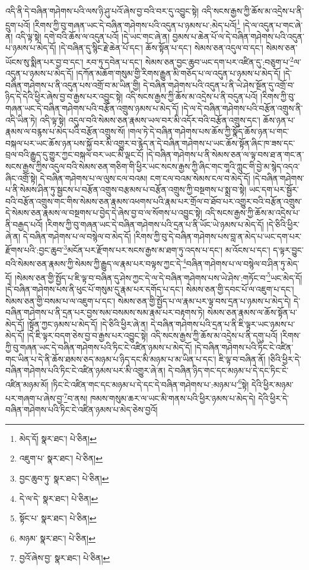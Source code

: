 འདི་ནི་དེ་བཞིན་གཤེགས་པའི་ལས་ཉི་ཤུ་པའོ་ཞེས་བྱ་བའི་བར་དུ་འབྱུང་སྟེ། འདི་སངས་རྒྱས་ཀྱི་ཆོས་མ་འདྲེས་པ་ནི་དྲུག་པའོ། །རིགས་ཀྱི་བུ་གཞན་ཡང་དེ་བཞིན་གཤེགས་པའི་འདུན་པ་ཉམས་པ་:མེད་པའོ།\footnote{མེད་དོ།  སྣར་ཐང་།  པེ་ཅིན། } །དེ་ལ་འདུན་པ་གང་ཞེ་ན། འདི་ལྟ་སྟེ། དགེ་བའི་ཆོས་ལ་འདུན་པའོ། །དེ་ཡང་གང་ཞེ་ན། བྱམས་པ་ཆེན་པོ་ལ་དེ་བཞིན་གཤེགས་པའི་འདུན་པ་ཉམས་པ་མེད་དོ། །དེ་བཞིན་དུ་སྙིང་རྗེ་ཆེན་པོ་དང་། ཆོས་སྟོན་པ་དང་། སེམས་ཅན་འདུལ་བ་དང་། སེམས་ཅན་ཡོངས་སུ་སྨིན་པར་བྱ་བ་དང་། རབ་ཏུ་དབེན་པ་དང་། སེམས་ཅན་བྱང་ཆུབ་ཡང་དག་པར་འཛིན་དུ་:བཅུག་པ་\footnote{འཇུག་པ་  སྣར་ཐང་།  པེ་ཅིན། }ལ་འདུན་པ་ཉམས་པ་མེད་དོ། །དཀོན་མཆོག་གསུམ་གྱི་རིགས་རྒྱུན་མི་གཅོད་པ་ལ་འདུན་པ་ཉམས་པ་མེད་དོ། །དེ་བཞིན་གཤེགས་པ་ནི་འདུན་པས་འགྲོ་བ་མ་ཡིན་གྱི། དེ་བཞིན་གཤེགས་པའི་འདུན་པ་ནི་ཡེ་ཤེས་སྔོན་དུ་འགྲོ་བ་ཉིད་དེ་དེའི་ཕྱིར་ཞེས་བྱ་བ་རྒྱས་པར་འབྱུང་སྟེ། འདི་སངས་རྒྱས་ཀྱི་ཆོས་མ་འདྲེས་པ་ནི་བདུན་པའོ། །རིགས་ཀྱི་བུ་གཞན་ཡང་དེ་བཞིན་གཤེགས་པའི་བརྩོན་འགྲུས་ཉམས་པ་མེད་དོ། །དེ་ལ་དེ་བཞིན་གཤེགས་པའི་བརྩོན་འགྲུས་ནི་འདི་ཡིན་ཏེ། འདི་ལྟ་སྟེ། འདུལ་བའི་སེམས་ཅན་རྣམས་ཡལ་བར་མི་འདོར་བའི་བརྩོན་འགྲུས་དང་། ཆོས་ཉན་པ་རྣམས་ལ་བརྙས་པ་མེད་པའི་བརྩོན་འགྲུས་སོ། །གལ་ཏེ་དེ་བཞིན་གཤེགས་པས་ཆོས་ཀྱི་སྣོད་ཆོས་ཉན་པ་གང་བསྐལ་པར་ཡང་ཆོས་ཉན་པས་སྐྱོ་བར་མི་འགྱུར་བ་རྙེད་ན་དེ་བཞིན་གཤེགས་པ་ཡང་ཆོས་སྟོན་ཞིང་ཁ་ཟས་དང་བྲལ་བའི་རྒྱུད་དུ་གྱུར་ཀྱང་བསྐལ་བར་ཡང་མི་ལྡང་ངོ། །དེ་བཞིན་གཤེགས་པ་ནི་སེམས་ཅན་ལ་ལྟ་བས་ཐ་ན་གང་ན་སངས་རྒྱས་ཀྱིས་འདུལ་བའི་སེམས་ཅན་གཅིག་གི་ཕྱིར་ཡང་སངས་རྒྱས་ཀྱི་ཞིང་གང་གཱའི་ཀླུང་གི་བྱེ་མ་སྙེད་འདའ་ཞིང་འགྲོ་སྟེ། དེ་བཞིན་གཤེགས་པ་ལ་ལུས་ངལ་བའམ། ངག་ངལ་བའམ་སེམས་ངལ་བ་མེད་དོ། །དེ་བཞིན་གཤེགས་པ་ནི་སེམས་ཤིན་ཏུ་སྦྱངས་པ་བརྩོན་འགྲུས་བརྩམས་པ་བརྩོན་འགྲུས་ཀྱི་བསྔགས་པ་སྨྲ་བ་སྟེ། ཡང་དག་པར་སྦྱོར་བའི་བརྩོན་འགྲུས་གང་གིས་སེམས་ཅན་རྣམས་འཕགས་པའི་རྣམ་པར་གྲོལ་བ་ཐོབ་པར་འགྱུར་བའི་བརྩོན་འགྲུས་དེ་སེམས་ཅན་རྣམས་ལ་བསྔགས་པ་བྱེད་དེ་ཞེས་བྱ་བ་ལ་སོགས་པ་འབྱུང་སྟེ། འདི་སངས་རྒྱས་ཀྱི་ཆོས་མ་འདྲེས་པ་ནི་བརྒྱད་པའོ། །རིགས་ཀྱི་བུ་གཞན་ཡང་དེ་བཞིན་གཤེགས་པའི་དྲན་པ་ནི་ཡོང་ཡེ་ཉམས་པ་མེད་དོ། །དེ་ཅིའི་ཕྱིར་ཞེ་ན། དེ་བཞིན་གཤེགས་པ་ལ་བསྙེལ་བ་མེད་དོ། །རིགས་ཀྱི་བུ་དེ་བཞིན་གཤེགས་པས་བླ་ན་མེད་པ་ཡང་དག་པར་རྫོགས་པའི་:བྱང་ཆུབ་\footnote{བྱང་ཆུབ་ཏུ་  སྣར་ཐང་།  པེ་ཅིན། }མངོན་པར་རྫོགས་པར་སངས་རྒྱས་མ་ཐག་ཏུ་འདས་པ་དང་། མ་འོངས་པ་དང་། ད་ལྟར་བྱུང་བའི་སེམས་ཅན་རྣམས་ཀྱི་སེམས་ཀྱི་རྒྱུད་ལ་རྣམ་པར་བལྟས་ཀྱང་དེ་\footnote{དེ་ལ་དེ་  སྣར་ཐང་།  པེ་ཅིན། }བཞིན་གཤེགས་པ་ལ་བསྙེལ་བ་ཤིན་ཏུ་མེད་དོ། །སེམས་ཅན་གྱི་སྤྱོད་པ་ཇི་ལྟ་བ་བཞིན་དུ་ཤེས་ཀྱང་དེ་ལ་དེ་བཞིན་གཤེགས་པས་ཡེ་ཤེས་:གཏོང་བ་\footnote{སྟོང་པ་  སྣར་ཐང་།  པེ་ཅིན། }ཡང་མེད་དོ། །དེ་བཞིན་གཤེགས་པས་ནི་ཕུང་པོ་གསུམ་དུ་རྣམ་པར་དགོད་པ་དང་། སེམས་ཅན་གྱི་དབང་པོ་ལ་འཇུག་པ་དང་། སེམས་ཅན་གྱི་བསམ་པ་ལ་འཇུག་པ་དང་། སེམས་ཅན་གྱི་སྤྱོད་པ་ལ་རྣམ་པར་ལྟ་བས་དྲན་པ་ཉམས་པ་མེད་དེ། དེ་བཞིན་གཤེགས་པ་ནི་དྲན་པར་བྱས་སམ་བསམས་སམ་རྣམ་པར་བརྟགས་ཏེ། སེམས་ཅན་རྣམས་ལ་ཆོས་སྟོན་པ་མེད་དོ། །སྟོན་ཀྱང་ཉམས་པ་མེད་དོ། །དེ་ཅིའི་ཕྱིར་ཞེ་ན། དེ་བཞིན་གཤེགས་པའི་དྲན་པ་ནི་ཇི་ལྟར་ཡང་ཉམས་པ་མེད་དོ། །དེ་ཇི་ལྟར་བདག་ཅེས་བྱ་བ་རྒྱས་པར་འབྱུང་སྟེ། འདི་སངས་རྒྱས་ཀྱི་ཆོས་མ་འདྲེས་པ་ནི་དགུ་པའོ། །རིགས་ཀྱི་བུ་གཞན་ཡང་དེ་བཞིན་གཤེགས་པའི་ཏིང་ངེ་འཛིན་ཉམས་པ་མེད་དོ། །དེ་བཞིན་གཤེགས་པའི་ཏིང་ངེ་འཛིན་གང་ཡིན་པ་དེ་ནི་ཆོས་ཐམས་ཅད་མཉམ་པ་ཉིད་དང་མི་མཉམ་པ་མ་ཡིན་པ་དང་། ཇི་ལྟ་བ་བཞིན་ནོ། །ཅིའི་ཕྱིར་དེ་བཞིན་གཤེགས་པའི་ཏིང་ངེ་འཛིན་ཉམས་པར་མི་འགྱུར་ཞེ་ན། དེ་བཞིན་ཉིད་གང་དང་མཉམ་པ་དེ་དང་ཏིང་ངེ་འཛིན་མཉམ་མོ། །ཏིང་ངེ་འཛིན་གང་དང་མཉམ་པ་དེ་དང་དེ་བཞིན་གཤེགས་པ་:མཉམ་པ་\footnote{མཉམ་  སྣར་ཐང་།  པེ་ཅིན། }སྟེ། དེའི་ཕྱིར་མཉམ་པར་གཞག་པ་ཞེས་བྱ་\footnote{བྱའོ་ཞེས་བྱ་  སྣར་ཐང་།  པེ་ཅིན། }བ་ནས། ཁམས་གསུམ་ཆར་ལ་ཡང་མི་གནས་པའི་ཕྱིར་ཉམས་པ་མེད་དེ། དེའི་ཕྱིར་དེ་བཞིན་གཤེགས་པའི་ཏིང་ངེ་འཛིན་ཉམས་པ་མེད་ཅེས་བྱའོ། 